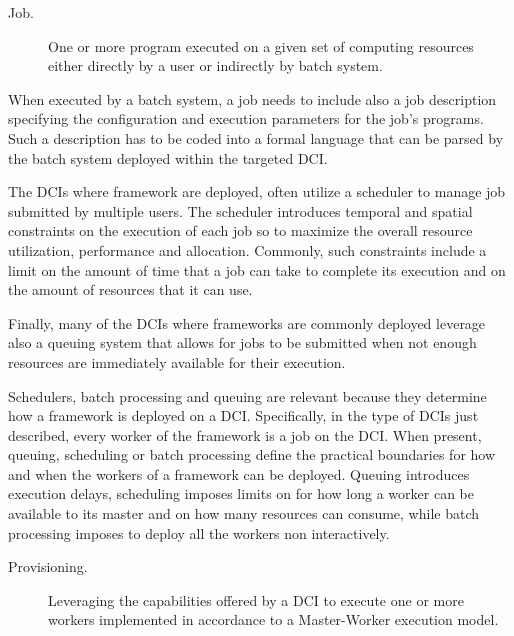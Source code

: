 \documentclass{sig-alternate}
\begin{document}

\begin{description}
  \item[Job.] One or more program executed on a given set of computing resources either directly by a user or indirectly by batch system.
\end{description}

When executed by a batch system, a job needs to include also a job description specifying the configuration and execution parameters for the job's programs. Such a description has to be coded into a formal language that can be parsed by the batch system deployed within the targeted DCI.

The DCIs where \pilotjobs framework are deployed, often utilize a scheduler to manage job submitted by multiple users. The scheduler introduces temporal and spatial constraints on the execution of each job so to maximize the overall resource utilization, performance and allocation. Commonly, such constraints include a limit on the amount of time that a job can take to complete its execution and on the amount of resources that it can use.

Finally, many of the DCIs where \pilotjob frameworks are commonly deployed leverage also a queuing system that allows for jobs to be submitted  when not enough resources are immediately available for their execution.

 Schedulers,
batch processing and queuing are relevant because they determine how a \pilotjob framework is deployed on a
DCI. Specifically, in the type of DCIs just described, every worker of the \pilotjob framework is a job on the
DCI. When present, queuing, scheduling or batch processing define the practical boundaries for how and when the
workers of a \pilotjob framework can be deployed. Queuing introduces execution delays, scheduling
imposes limits on for how long a worker can be available to its master and on how many resources can consume,
while batch processing imposes to deploy all the workers non interactively.

\begin{description}

  \item[Provisioning.] Leveraging the capabilities offered by a DCI to execute one or more workers implemented in accordance to a Master-Worker execution model.	
\end{description}
\end{document}
